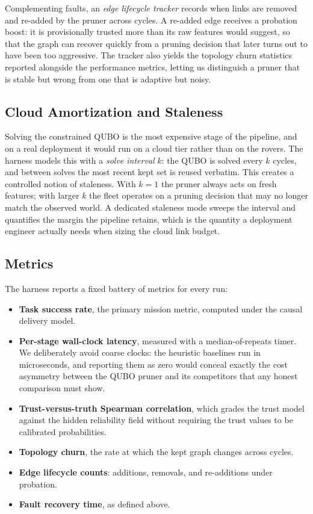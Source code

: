 Complementing faults, an \emph{edge lifecycle tracker} records when links
are removed and re-added by the pruner across cycles. A re-added edge
receives a probation boost: it is provisionally trusted more than its
raw features would suggest, so that the graph can recover quickly from a
pruning decision that later turns out to have been too aggressive. The
tracker also yields the topology churn statistics reported alongside the
performance metrics, letting us distinguish a pruner that is stable but
wrong from one that is adaptive but noisy.

\subsection{Cloud Amortization and Staleness}

Solving the constrained QUBO is the most expensive stage of the pipeline,
and on a real deployment it would run on a cloud tier rather than on the
rovers. The harness models this with a \emph{solve interval} $k$: the
QUBO is solved every $k$ cycles, and between solves the most recent kept
set is reused verbatim. This creates a controlled notion of staleness.
With $k = 1$ the pruner always acts on fresh features; with larger $k$
the fleet operates on a pruning decision that may no longer match the
observed world. A dedicated staleness mode sweeps the interval and
quantifies the margin the pipeline retains, which is the quantity a
deployment engineer actually needs when sizing the cloud link budget.

\subsection{Metrics}

The harness reports a fixed battery of metrics for every run:

\begin{itemize}
  \item \textbf{Task success rate}, the primary mission metric, computed
    under the causal delivery model.
  \item \textbf{Per-stage wall-clock latency}, measured with a
    median-of-repeats timer. We deliberately avoid coarse clocks: the
    heuristic baselines run in microseconds, and reporting them as zero
    would conceal exactly the cost asymmetry between the QUBO pruner and
    its competitors that any honest comparison must show.
  \item \textbf{Trust-versus-truth Spearman correlation}, which grades
    the trust model against the hidden reliability field without
    requiring the trust values to be calibrated probabilities.
  \item \textbf{Topology churn}, the rate at which the kept graph
    changes across cycles.
  \item \textbf{Edge lifecycle counts}: additions, removals, and
    re-additions under probation.
  \item \textbf{Fault recovery time}, as defined above.
\end{itemize}

